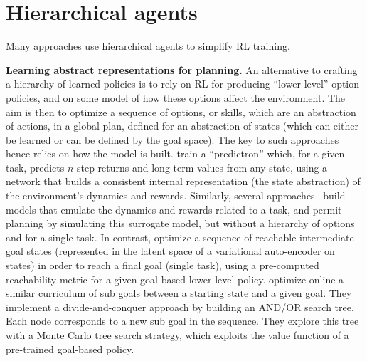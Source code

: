 \section{Hierarchical agents}

Many approaches use hierarchical agents to simplify RL training.

\textbf{Learning abstract representations for planning.}
An alternative to crafting a hierarchy of learned policies is to rely on RL for producing ``lower level'' option
policies, and on some model of how these options affect the environment.
The aim is then to optimize a sequence of options, or skills, which are an abstraction of actions, in a global plan,
defined for an abstraction of states (which can either be learned or can be defined by the goal space).
The key to such approaches hence relies on how the model is built.
\citet{silver2017predictron} train a ``predictron'' which, for a given task, predicts $n$-step returns and long term
values from any state, using a network that builds a consistent internal representation (the state abstraction) of the
environment's dynamics and rewards.
Similarly, several approaches~\citep{ha2018world,schrittwieser2020mastering,hafner2020dream,hafner2021mastering} build
models that emulate the dynamics and rewards related to a task, and permit planning by simulating this surrogate model,
but without a hierarchy of options and for a single task.
In contrast, \citet{nasiriany2019planning} optimize a sequence of reachable intermediate goal states (represented in the
latent space of a variational auto-encoder on states) in order to reach a final goal (single task), using a pre-computed
reachability metric for a given goal-based lower-level policy.
\citet{parascandolo2020divide} optimize online a similar curriculum of sub goals between a starting state and a given
goal.
They implement a divide-and-conquer approach by building an AND/OR search tree.
Each node corresponds to a new sub goal in the sequence.
They explore this tree with a Monte Carlo tree search strategy, which exploits the value function of a pre-trained
goal-based policy.

